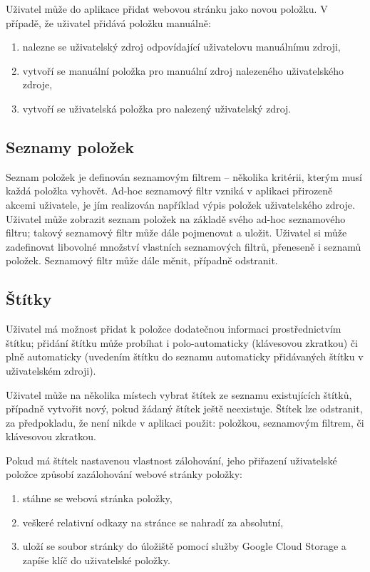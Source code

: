 Uživatel může do aplikace přidat webovou stránku jako novou položku.
V případě, že uživatel přidává položku manuálně:
\begin{enumerate}
	\item nalezne se uživatelský zdroj odpovídající uživatelovu manuálnímu zdroji,
	\item vytvoří se manuální položka pro manuální zdroj nalezeného uživatelského zdroje,
	\item vytvoří se uživatelská položka pro nalezený uživatelský zdroj.
\end{enumerate}

\subsection{Seznamy položek}

Seznam položek je definován seznamovým filtrem -- několika kritérii, kterým musí každá položka vyhovět.
Ad-hoc seznamový filtr vzniká v aplikaci přirozeně akcemi uživatele, je jím realizován například výpis položek uživatelského zdroje.
Uživatel může zobrazit seznam položek na základě svého ad-hoc seznamového filtru; takový seznamový filtr může dále pojmenovat a uložit.
Uživatel si může zadefinovat libovolné množství vlastních seznamových filtrů, přeneseně i seznamů položek.
Seznamový filtr může dále měnit, případně odstranit.

\subsection{Štítky}

Uživatel má možnost přidat k položce dodatečnou informaci prostřednictvím štítku; přidání štítku může probíhat i polo-automaticky (klávesovou zkratkou) či plně automaticky (uvedením štítku do seznamu automaticky přidávaných štítku v uživatelském zdroji).

Uživatel může na několika místech vybrat štítek ze seznamu existujících štítků, případně vytvořit nový, pokud žádaný štítek ještě neexistuje.
Štítek lze odstranit, za předpokladu, že není nikde v aplikaci použit: položkou, seznamovým filtrem, či klávesovou zkratkou.

Pokud má štítek nastavenou vlastnost zálohování, jeho přiřazení uživatelské položce způsobí zazálohování webové stránky položky:
\begin{enumerate}
	\item stáhne se webová stránka položky,
	\item veškeré relativní odkazy na stránce se nahradí za absolutní,
	\item uloží se soubor stránky do úložiště pomocí služby Google Cloud Storage a zapíše klíč do uživatelské položky.
\end{enumerate}

